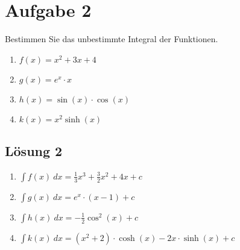 \documentclass[main.tex]{subfiles}
\begin{document}
\section{Aufgabe 2}
Bestimmen Sie das unbestimmte Integral der Funktionen.

\begin{enumerate}
    \item $f( x) =x^{2} +3x+4$
    \item $g( x) =e^{x} \cdotp x$
    \item $h( x) =\sin( x) \cdotp \cos( x)$
    \item $k( x) =x^{2}\sinh( x)$
\end{enumerate}


\subsection{Lösung 2}

\begin{enumerate}
    \item $\int f( x) \ dx=\frac{1}{3} x^{3} +\frac{3}{2} x^{2} +4x+c$
    \item $\int g( x) \ dx=e^{x} \cdotp ( x-1) +c$
    \item $\int h( x) \ dx=-\frac{1}{2}\cos^{2}( x) +c$
    \item $\int k( x) \ dx=\left( x^{2} +2\right) \cdotp \cosh( x) -2x\cdotp \sinh( x) +c$
\end{enumerate}
\end{document}
